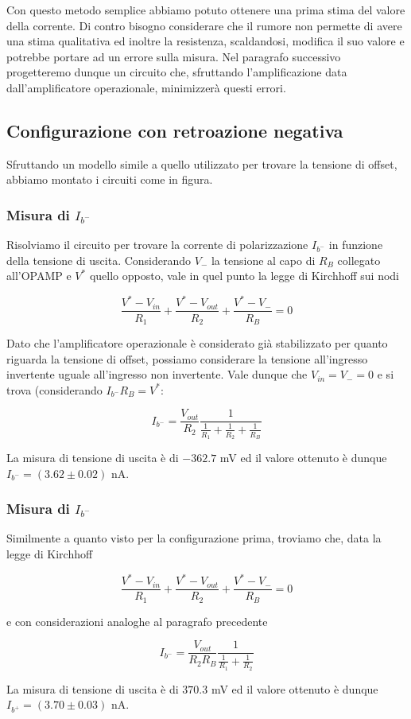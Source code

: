 Con questo metodo semplice abbiamo potuto ottenere una prima stima del valore della corrente. Di contro bisogno considerare che il rumore non permette di avere una stima qualitativa ed inoltre la resistenza, scaldandosi, modifica il suo valore e potrebbe portare ad un errore sulla misura. Nel paragrafo successivo progetteremo dunque un circuito che, sfruttando l'amplificazione data dall'amplificatore operazionale, minimizzerà questi errori.

\subsection{Configurazione con retroazione negativa}

Sfruttando un modello simile a quello utilizzato per trovare la tensione di offset, abbiamo montato i circuiti come in figura.

\subsubsection{Misura di $I_{b^-}$}

Risolviamo il circuito per trovare la corrente di polarizzazione $I_{b^-}$ in funzione della tensione di uscita. Considerando $V_{-}$ la tensione al capo di $R_B$ collegato all'OPAMP e $V^*$ quello opposto, vale in quel punto la legge di Kirchhoff sui nodi

$$\frac{V^* - V_{in}}{R_1} + \frac{V^*-V_{out}}{R_2} + \frac{V^*-V_{-}}{R_B}=0$$

Dato che l'amplificatore operazionale è considerato già stabilizzato per quanto riguarda la tensione di offset, possiamo considerare la tensione all'ingresso invertente uguale all'ingresso non invertente. Vale dunque che $V_{in}=V_{-}=0$ e si trova (considerando $I_{b^-} R_B = V^*$:

$$I_{b^-}=\frac{V_{out}}{R_2}\frac{1}{\frac{1}{R_1}+\frac{1}{R_2}+\frac{1}{R_B}}$$

La misura di tensione di uscita è di $-362.7$ \si{\milli\volt} ed il valore ottenuto è dunque $I_{b^-} = (3.62 \pm 0.02)$ \si{\nano\ampere}.

\subsubsection{Misura di $I_{b^-}$}

Similmente a quanto visto per la configurazione prima, troviamo che, data la legge di Kirchhoff

$$\frac{V^* - V_{in}}{R_1} + \frac{V^*-V_{out}}{R_2} + \frac{V^*-V_{-}}{R_B}=0$$

e con considerazioni analoghe al paragrafo precedente

$$I_{b^-}=\frac{V_{out}}{R_2 R_B}\frac{1}{\frac{1}{R_1}+\frac{1}{R_2}}$$

La misura di tensione di uscita è di $370.3$ \si{\milli\volt} ed il valore ottenuto è dunque $I_{b^+} = (3.70 \pm 0.03)$ \si{\nano\ampere}.
